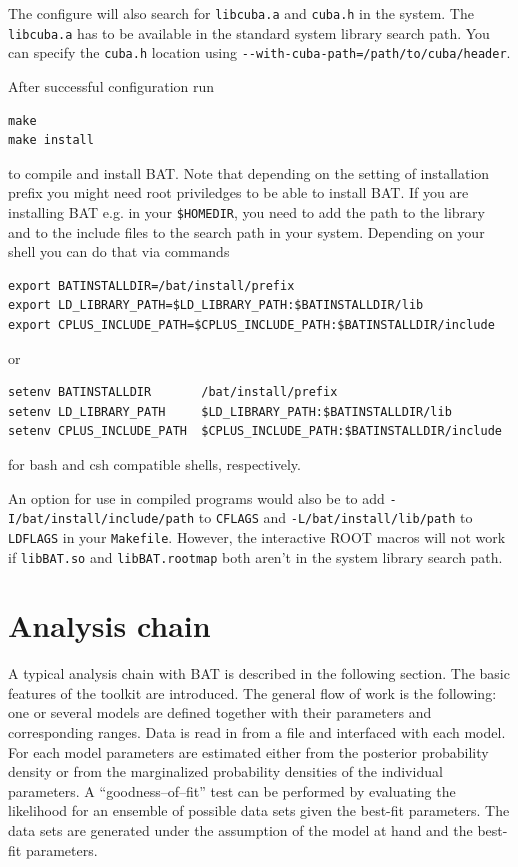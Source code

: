 \documentclass[11pt, a4paper]{article}
\begin{document}
The configure will also search for \verb|libcuba.a| and \verb|cuba.h|
in the system.  The \verb|libcuba.a| has to be available in the
standard system library search path. You can specify the \verb|cuba.h|
location using \verb|--with-cuba-path=/path/to/cuba/header|.

After successful configuration run
%
\begin{verbatim}
make
make install
\end{verbatim}
%
to compile and install BAT. Note that depending on the setting of
installation prefix you might need root priviledges to be able to
install BAT. If you are installing BAT e.g. in your \verb|$HOMEDIR|,
you need to add the path to the library and to the include files to
the search path in your system. Depending on your shell you can do
that via commands
%
\begin{verbatim}
export BATINSTALLDIR=/bat/install/prefix
export LD_LIBRARY_PATH=$LD_LIBRARY_PATH:$BATINSTALLDIR/lib
export CPLUS_INCLUDE_PATH=$CPLUS_INCLUDE_PATH:$BATINSTALLDIR/include
\end{verbatim}
%
or
%
\begin{verbatim}
setenv BATINSTALLDIR       /bat/install/prefix
setenv LD_LIBRARY_PATH     $LD_LIBRARY_PATH:$BATINSTALLDIR/lib
setenv CPLUS_INCLUDE_PATH  $CPLUS_INCLUDE_PATH:$BATINSTALLDIR/include
\end{verbatim}
%
for bash and csh compatible shells, respectively.

An option for use in compiled programs would also be to add
\verb|-I/bat/install/include/path| to \verb|CFLAGS| and
\verb|-L/bat/install/lib/path| to \verb|LDFLAGS| in your
\verb|Makefile|. However, the interactive ROOT macros will not work if
\verb|libBAT.so| and \verb|libBAT.rootmap| both aren't in the system
library search path.


\pagebreak 

\section{Analysis chain}
\label{section:analysis}

A typical analysis chain with BAT is described in the following
section. The basic features of the toolkit are introduced. The general
flow of work is the following: one or several models are defined
together with their parameters and corresponding ranges. Data is read
in from a file and interfaced with each model. For each model
parameters are estimated either from the posterior probability density
or from the marginalized probability densities of the individual
parameters. A ``goodness--of--fit'' test can be performed by
evaluating the likelihood for an ensemble of possible data sets given
the best-fit parameters. The data sets are generated under the
assumption of the model at hand and the best-fit parameters. \\
\end{document}
